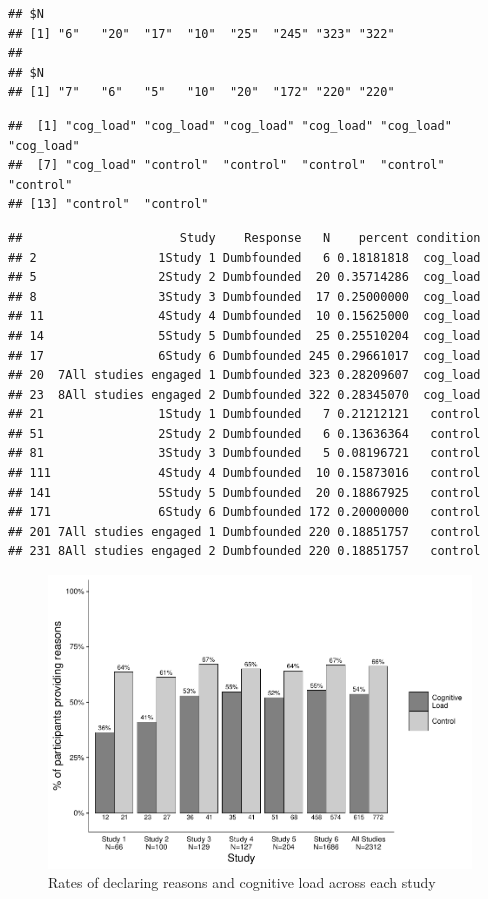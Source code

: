 \documentclass[
  american,
  man,floatsintext]{apa7}
\begin{document}
\begin{verbatim}
## $N
## [1] "6"   "20"  "17"  "10"  "25"  "245" "323" "322"
## 
## $N
## [1] "7"   "6"   "5"   "10"  "20"  "172" "220" "220"
\end{verbatim}

\begin{verbatim}
##  [1] "cog_load" "cog_load" "cog_load" "cog_load" "cog_load" "cog_load"
##  [7] "cog_load" "control"  "control"  "control"  "control"  "control" 
## [13] "control"  "control"
\end{verbatim}

\begin{verbatim}
##                      Study    Response   N    percent condition
## 2                 1Study 1 Dumbfounded   6 0.18181818  cog_load
## 5                 2Study 2 Dumbfounded  20 0.35714286  cog_load
## 8                 3Study 3 Dumbfounded  17 0.25000000  cog_load
## 11                4Study 4 Dumbfounded  10 0.15625000  cog_load
## 14                5Study 5 Dumbfounded  25 0.25510204  cog_load
## 17                6Study 6 Dumbfounded 245 0.29661017  cog_load
## 20  7All studies engaged 1 Dumbfounded 323 0.28209607  cog_load
## 23  8All studies engaged 2 Dumbfounded 322 0.28345070  cog_load
## 21                1Study 1 Dumbfounded   7 0.21212121   control
## 51                2Study 2 Dumbfounded   6 0.13636364   control
## 81                3Study 3 Dumbfounded   5 0.08196721   control
## 111               4Study 4 Dumbfounded  10 0.15873016   control
## 141               5Study 5 Dumbfounded  20 0.18867925   control
## 171               6Study 6 Dumbfounded 172 0.20000000   control
## 201 7All studies engaged 1 Dumbfounded 220 0.18851757   control
## 231 8All studies engaged 2 Dumbfounded 220 0.18851757   control
\end{verbatim}

\newpage

\begin{figure}
\centering
\includegraphics{Combined_analyses_files/figure-latex/ch5figall-1.pdf}
\caption{\label{fig:ch5figall}Rates of declaring reasons and cognitive load across each study}
\end{figure}
\end{document}
